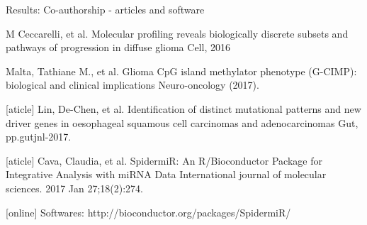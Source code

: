 \documentclass[slidestop,compress,11pt,xcolor=dvipsnames]{beamer}
\begin{document}
\begin{frame}{Results: Co-authorship - articles and software}
\begin{thebibliography}{10}
\tiny


\beamertemplatearticlebibitems
{}
M Ceccarelli, et al.
\newblock Molecular profiling reveals biologically discrete subsets and pathways of progression in diffuse glioma
\newblock Cell, 2016

\beamertemplatearticlebibitems
{}
Malta, Tathiane M., et al.
\newblock Glioma CpG island methylator phenotype (G-CIMP): biological and clinical implications
\newblock Neuro-oncology (2017).

[aticle]
Lin, De-Chen, et al.
\newblock Identification of distinct mutational patterns and new driver genes in oesophageal squamous cell carcinomas and adenocarcinomas
\newblock Gut, pp.gutjnl-2017.

[aticle]
Cava, Claudia, et al.
\newblock SpidermiR: An R/Bioconductor Package for Integrative Analysis with miRNA Data
\newblock International journal of molecular sciences. 2017 Jan 27;18(2):274.


[online]
  Softwares:
  \newblock 	http://bioconductor.org/packages/SpidermiR/
 \end{thebibliography}
\end{frame}
\end{document}
